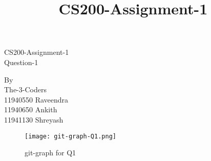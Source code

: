 \documentclass[a4paper]{article} %
\begin{document}
  
	\title{CS200-Assignment-1} \centering
	\Huge
	CS200-Assignment-1\\
	Question-1 \\ \vspace{2cm}
	\huge
	
	By \\
	The-3-Coders    \\ \vspace{0.5cm}
	\Large
	11940550 Raveendra\\
	 11940650 Ankith\\
	 11941130 Shreyash \\         %
 
 \begin{figure}
 	\texttt{[image: git-graph-Q1.png]}
 	\caption{git-graph for Q1}
 \end{figure}

 
\end{document}
